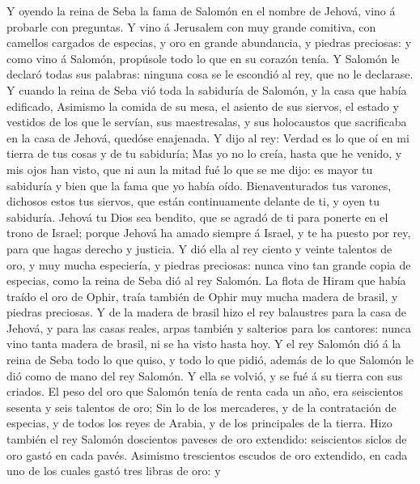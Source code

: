  Y oyendo la reina de Seba la fama de Salomón en el nombre
de Jehová, vino á probarle con preguntas.  Y vino á
Jerusalem con muy grande comitiva, con camellos cargados de especias, y
oro en grande abundancia, y piedras preciosas: y como vino á Salomón,
propúsole todo lo que en su corazón tenía.  Y Salomón le
declaró todas sus palabras: ninguna cosa se le escondió al rey, que no
le declarase.  Y cuando la reina de Seba vió toda la
sabiduría de Salomón, y la casa que había edificado, 
Asimismo la comida de su mesa, el asiento de sus siervos, el estado y
vestidos de los que le servían, sus maestresalas, y sus holocaustos que
sacrificaba en la casa de Jehová, quedóse enajenada.  Y dijo
al rey: Verdad es lo que oí en mi tierra de tus cosas y de tu sabiduría;
 Mas yo no lo creía, hasta que he venido, y mis ojos han
visto, que ni aun la mitad fué lo que se me dijo: es mayor tu sabiduría
y bien que la fama que yo había oído.  Bienaventurados tus
varones, dichosos estos tus siervos, que están continuamente delante de
ti, y oyen tu sabiduría.  Jehová tu Dios sea bendito, que se
agradó de ti para ponerte en el trono de Israel; porque Jehová ha amado
siempre á Israel, y te ha puesto por rey, para que hagas derecho y
justicia.  Y dió ella al rey ciento y veinte talentos de
oro, y muy mucha especiería, y piedras preciosas: nunca vino tan grande
copia de especias, como la reina de Seba dió al rey Salomón.
 La flota de Hiram que había traído el oro de Ophir, traía
también de Ophir muy mucha madera de brasil, y piedras preciosas.
 Y de la madera de brasil hizo el rey balaustres para la
casa de Jehová, y para las casas reales, arpas también y salterios para
los cantores: nunca vino tanta madera de brasil, ni se ha visto hasta
hoy.  Y el rey Salomón dió á la reina de Seba todo lo que
quiso, y todo lo que pidió, además de lo que Salomón le dió como de mano
del rey Salomón. Y ella se volvió, y se fué á su tierra con sus criados.
 El peso del oro que Salomón tenía de renta cada un año,
era seiscientos sesenta y seis talentos de oro;  Sin lo de
los mercaderes, y de la contratación de especias, y de todos los reyes
de Arabia, y de los principales de la tierra.  Hizo también
el rey Salomón doscientos paveses de oro extendido: seiscientos siclos
de oro gastó en cada pavés.  Asimismo trescientos escudos
de oro extendido, en cada uno de los cuales gastó tres libras de oro: y
